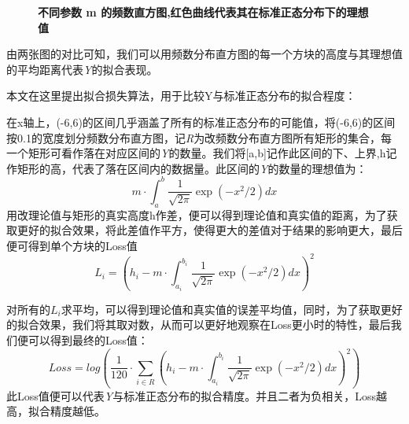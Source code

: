 \documentclass{article}
\begin{document}
\begin{figure}[h]

\caption{\textbf{不同参数 m 的频数直方图,红色曲线代表其在标准正态分布下的理想值}}
\end{figure}




由两张图的对比可知，我们可以用频数分布直方图的每一个方块的高度与其理想值的平均距离代表\textit{Y}的拟合表现。

本文在这里提出拟合损失算法，用于比较Y与标准正态分布的拟合程度：

在x轴上，(-6,6)的区间几乎涵盖了所有的标准正态分布的可能值，将(-6,6)的区间按0.1的宽度划分频数分布直方图，记\textit{R}为改频数分布直方图所有矩形的集合，每一个矩形可看作落在对应区间的\textit{Y}的数量。我们将[a,b]记作此区间的下、上界,h记作矩形的高，代表了落在区间内的数据量。此区间的\textit{Y}的数量的理想值为：
\[
m\cdot\int_{a}^{b}\frac{1}{\sqrt{2\pi}}\exp(-x^2/2)dx
\]
用改理论值与矩形的真实高度h作差，便可以得到理论值和真实值的距离，为了获取更好的拟合效果，将此差值作平方，使得更大的差值对于结果的影响更大，最后便可得到单个方块的Loss值
\[
L_i = (h_i - m\cdot\int_{a_i}^{b_i}\frac{1}{\sqrt{2\pi}}\exp(-x^2/2)dx)^2
\]

对所有的$L_i$求平均，可以得到理论值和真实值的误差平均值，同时，为了获取更好的拟合效果，我们将其取对数，从而可以更好地观察在Loss更小时的特性，最后我们便可以得到最终的Loss值：
\[
Loss = log(\frac{1}{120}\cdot\sum_{i\in R}^{}(h_i - m\cdot\int_{a_i}^{b_i}\frac{1}{\sqrt{2\pi}}\exp(-x^2/2)dx)^2)
\]
此Loss值便可以代表\textit{Y}与标准正态分布的拟合精度。并且二者为负相关，Loss越高，拟合精度越低。
\end{document}
